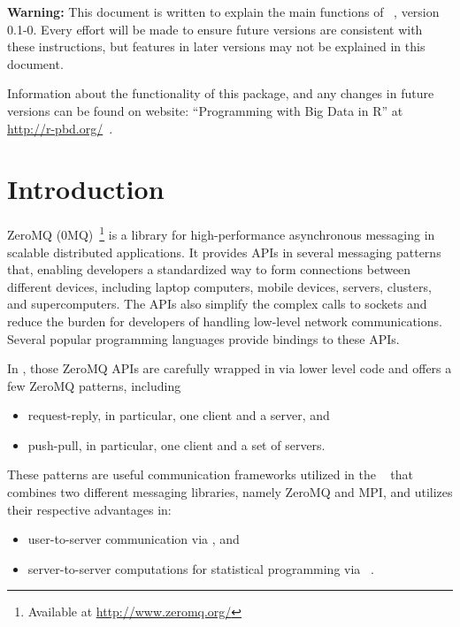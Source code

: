 
{\color{red} \bf Warning:}
This document is written to explain the main functions of 
~\citep{Chen2015}, version 0.1-0.  Every effort will be made to 
ensure future versions are consistent with these instructions, but features in 
later versions may not be explained in this document.

Information about the functionality of this package,
and any changes in future versions can be found on website:
``Programming with Big Data in R'' at
\url{http://r-pbd.org/}~\citep{pbdR2012}.




\section[Introduction]{Introduction}
\label{sec:introduction}


ZeroMQ (0MQ)~\citep{hintjens2013zeromq}\footnote{Available at 
\url{http://www.zeromq.org/}} is a library for high-performance
asynchronous messaging in scalable distributed applications. It provides
APIs in several messaging patterns that, enabling developers a standardized 
way to form connections between different devices, including laptop computers, 
mobile devices, servers, clusters, and supercomputers. The APIs also simplify 
the complex calls to sockets and reduce the burden for developers of handling
low-level network communications.  Several popular programming languages 
provide bindings to these APIs.

In , those ZeroMQ APIs are carefully wrapped in 
via lower level  code and offers a few ZeroMQ patterns, including
\begin{itemize}
\item request-reply, in particular, one client and a server, and
\item push-pull, in particular, one client and a set of servers.
\end{itemize}
These patterns are useful communication frameworks utilized in the
~\citep{Schmidt2015} that combines two different messaging 
libraries, namely ZeroMQ and MPI, and utilizes their respective advantages in:
\begin{itemize}
\item user-to-server communication via , and
\item server-to-server computations for statistical programming  
via ~\citep{Chen2012}.
\end{itemize}
